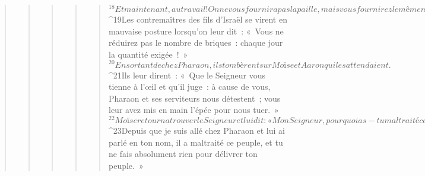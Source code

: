 \begin{verse}
\begin{verse}
\begin{verse}
\begin{verse}
\begin{verse}
${}^{18}Et maintenant, au travail ! On ne vous fournira pas la paille, mais vous fournirez le même nombre de briques. »
${}^{19}Les contremaîtres des fils d’Israël se virent en mauvaise posture lorsqu’on leur dit : « Vous ne réduirez pas le nombre de briques : chaque jour la quantité exigée ! » 
${}^{20}En sortant de chez Pharaon, ils tombèrent sur Moïse et Aaron qui les attendaient. 
${}^{21}Ils leur dirent : « Que le Seigneur vous tienne à l’œil et qu’il juge : à cause de vous, Pharaon et ses serviteurs nous détestent ; vous leur avez mis en main l’épée pour nous tuer. »
${}^{22}Moïse retourna trouver le Seigneur et lui dit : « Mon Seigneur, pourquoi as-tu maltraité ce peuple ? Pourquoi donc m’as-tu envoyé ? 
${}^{23}Depuis que je suis allé chez Pharaon et lui ai parlé en ton nom, il a maltraité ce peuple, et tu ne fais absolument rien pour délivrer ton peuple. »
      

\end{verse}
\end{verse}
\end{verse}
\end{verse}
\end{verse}
